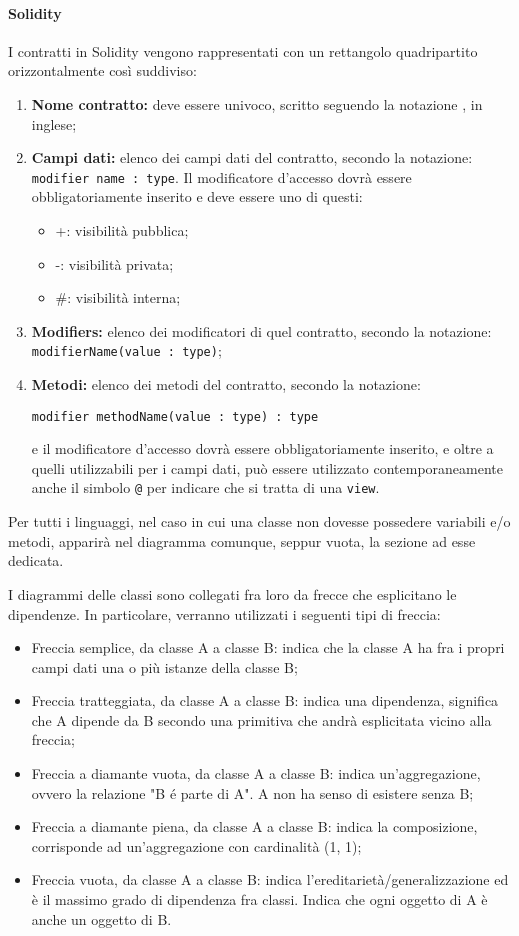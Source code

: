 \documentclass[NormeDiProgetto.tex]{subfiles}
\begin{document}
\paragraph{Solidity}
I contratti in Solidity vengono rappresentati con un rettangolo quadripartito orizzontalmente così suddiviso:
\begin{enumerate}
	\item \textbf{Nome contratto:} deve essere univoco, scritto seguendo la notazione , in inglese;
	\item \textbf{Campi dati:} elenco dei campi dati del contratto, secondo la notazione: \texttt{modifier name : type}. Il modificatore d'accesso dovrà essere obbligatoriamente inserito e deve essere uno di questi:
	\begin{itemize}
		\item +: visibilità pubblica;
		\item -: visibilità privata;
		\item \#: visibilità interna;
	\end{itemize}
	\item \textbf{Modifiers:} elenco dei modificatori di quel contratto, secondo la notazione:
		\texttt{modifierName(value : type)};
	\item \textbf{Metodi:} elenco dei metodi del contratto, secondo la notazione:
	\begin{center}
		\texttt{modifier methodName(value : type) : type}
	\end{center}
	e il modificatore d'accesso dovrà essere obbligatoriamente inserito, e oltre a quelli utilizzabili per i campi dati, può essere utilizzato contemporaneamente anche il simbolo \texttt{@} per indicare che si tratta di una \texttt{view}.
\end{enumerate}

Per tutti i linguaggi, nel caso in cui una classe non dovesse possedere variabili e/o metodi, apparirà nel diagramma comunque, seppur vuota, la sezione ad esse dedicata.

I diagrammi delle classi sono collegati fra loro da frecce che esplicitano le dipendenze.
In particolare, verranno utilizzati i seguenti tipi di freccia:
\begin{itemize}
	\item Freccia semplice, da classe A a classe B: indica che la classe A ha fra i propri campi dati una o più istanze della classe B;
	\item Freccia tratteggiata, da classe A a classe B: indica una dipendenza, significa che A dipende da B secondo una primitiva che andrà esplicitata vicino alla freccia;
	\item Freccia a diamante vuota, da classe A a classe B: indica un'aggregazione, ovvero la relazione "B é parte di A". A non ha senso di esistere senza B;
	\item Freccia a diamante piena, da classe A a classe B: indica la composizione, corrisponde ad un'aggregazione con cardinalità (1, 1);
	\item Freccia vuota, da classe A a classe B: indica l'ereditarietà/generalizzazione ed è il massimo grado di dipendenza fra classi. Indica che ogni oggetto di A è anche un oggetto di B.
\end{itemize}
\end{document}

